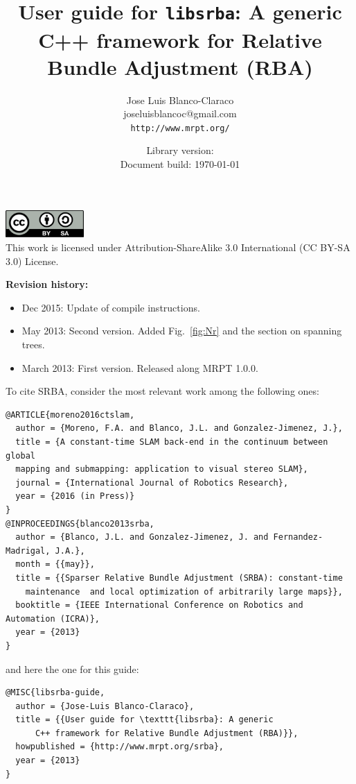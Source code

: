 \documentclass[a4paper,11pt]{article}
\title{User guide for \texttt{libsrba}: A generic C++ framework for Relative Bundle Adjustment (RBA)}
\author{Jose Luis Blanco-Claraco \\ joseluisblancoc@gmail.com \\ \texttt{http://www.mrpt.org/} }
\date{Library version: \SRBALIBVERSION \\ Document build: \today }
\begin{document}
\maketitle


\vfill

\begin{scriptsize}
\begin{center}
\includegraphics[width=3cm]{imgs/by-sa.pdf}
\\
This work is licensed under Attribution-ShareAlike 3.0 International (CC BY-SA 3.0) License.
\end{center}
\end{scriptsize}

\vspace{1cm}

\newpage

\textbf{Revision history:}
\begin{itemize}
 \item Dec 2015: Update of compile instructions.
 \item May 2013: Second version. Added Fig.~\ref{fig:Nr} and the section on spanning trees.
 \item March 2013: First version. Released along MRPT 1.0.0.
\end{itemize}

\vfill


\begin{small}
To cite SRBA, consider the most relevant work among the following ones: 

\begin{verbatim}
@ARTICLE{moreno2016ctslam,
  author = {Moreno, F.A. and Blanco, J.L. and Gonzalez-Jimenez, J.},
  title = {A constant-time SLAM back-end in the continuum between global 
  mapping and submapping: application to visual stereo SLAM},
  journal = {International Journal of Robotics Research},
  year = {2016 (in Press)}
}
@INPROCEEDINGS{blanco2013srba,
  author = {Blanco, J.L. and Gonzalez-Jimenez, J. and Fernandez-Madrigal, J.A.},
  month = {{may}},
  title = {{Sparser Relative Bundle Adjustment (SRBA): constant-time 
    maintenance  and local optimization of arbitrarily large maps}},
  booktitle = {IEEE International Conference on Robotics and Automation (ICRA)},
  year = {2013}
}
\end{verbatim} 

\noindent and here the one for this guide:

\begin{verbatim}
@MISC{libsrba-guide,
  author = {Jose-Luis Blanco-Claraco},
  title = {{User guide for \texttt{libsrba}: A generic 
      C++ framework for Relative Bundle Adjustment (RBA)}},
  howpublished = {http://www.mrpt.org/srba},
  year = {2013}
} 
\end{verbatim} 

\end{small}
\end{document}
